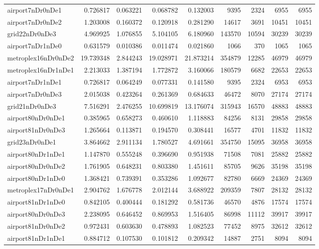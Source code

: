 \documentclass[../../../thesis.tex]{subfiles}
\begin{document}
\begin{longtable}{|l|r|r|r|r|r|r|r|r|}
airport7nDr0nDe1 & 0.726817 & 0.063221 & 0.068782 & 0.132003 & 9395 & 2324 & 6955 & 6955 \\
airport7nDr0nDe2 & 1.203008 & 0.160372 & 0.120918 & 0.281290 & 14617 & 3691 & 10451 & 10451 \\
grid22nDr0nDe3 & 4.969925 & 1.076855 & 5.104105 & 6.180960 & 143570 & 10594 & 30239 & 30239 \\
airport7nDr1nDe0 & 0.631579 & 0.010386 & 0.011474 & 0.021860 & 1066 & 370 & 1065 & 1065 \\
metroplex16nDr0nDe2 & 19.739348 & 2.844243 & 19.028971 & 21.873214 & 354879 & 12285 & 46979 & 46979 \\
metroplex16nDr1nDe1 & 2.213033 & 1.387194 & 1.772872 & 3.160066 & 180579 & 6682 & 22653 & 22653 \\
airport7nDr1nDe1 & 0.726817 & 0.064249 & 0.077331 & 0.141580 & 9395 & 2324 & 6953 & 6953 \\
airport7nDr0nDe3 & 2.015038 & 0.423264 & 0.261369 & 0.684633 & 46472 & 8070 & 27174 & 27174 \\
grid21nDr0nDe3 & 7.516291 & 2.476255 & 10.699819 & 13.176074 & 315943 & 16570 & 48883 & 48883 \\
airport80nDr0nDe1 & 0.385965 & 0.658273 & 0.460610 & 1.118883 & 84256 & 8131 & 29858 & 29858 \\
airport81nDr0nDe3 & 1.265664 & 0.113871 & 0.194570 & 0.308441 & 16577 & 4701 & 11832 & 11832 \\
grid23nDr0nDe1 & 3.864662 & 2.911134 & 1.780527 & 4.691661 & 354750 & 15095 & 36958 & 36958 \\
airport80nDr1nDe1 & 1.147870 & 0.555248 & 0.396690 & 0.951938 & 71508 & 7081 & 25882 & 25882 \\
airport80nDr0nDe2 & 1.761905 & 0.648231 & 0.803380 & 1.451611 & 85705 & 9626 & 35198 & 35198 \\
airport80nDr1nDe0 & 1.368421 & 0.739391 & 0.353286 & 1.092677 & 82780 & 6669 & 24369 & 24369 \\
metroplex17nDr0nDe1 & 2.904762 & 1.676778 & 2.012144 & 3.688922 & 209359 & 7807 & 28132 & 28132 \\
airport81nDr1nDe0 & 0.842105 & 0.400444 & 0.181292 & 0.581736 & 46570 & 4876 & 17574 & 17574 \\
airport80nDr0nDe3 & 2.238095 & 0.646452 & 0.869953 & 1.516405 & 86998 & 11112 & 39917 & 39917 \\
airport81nDr0nDe2 & 0.972431 & 0.603630 & 0.478893 & 1.082523 & 77452 & 8975 & 32612 & 32612 \\
airport81nDr1nDe1 & 0.884712 & 0.107530 & 0.101812 & 0.209342 & 14887 & 2751 & 8094 & 8094 \\

\end{longtable}
\end{document}
